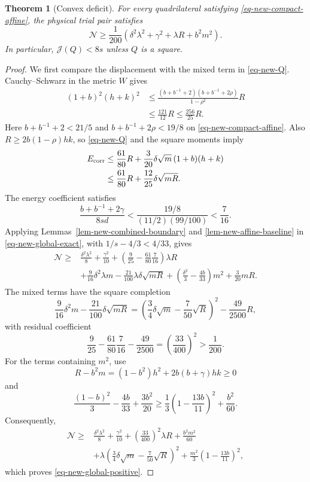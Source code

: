 \documentclass[11pt]{amsart}
\newtheorem{theorem}{Theorem}[section]
\theoremstyle{remark}\newtheorem{remark}[theorem]{Remark}
\numberwithin{equation}{section}
\begin{document}
\begin{theorem}[Convex deficit]\label{thm-uniform-convex}
For every quadrilateral satisfying \eqref{eq-new-compact-affine},
the physical trial pair satisfies
\begin{equation}\label{eq-new-global-positive}
\mathcal N\ge\frac1{200}
\left(\delta^2\lambda^2+\gamma^2+\lambda R+b^2m^2\right).
\end{equation}
In particular, \(\mathcal J(Q)<8s\) unless \(Q\) is a square.
\end{theorem}

\begin{proof}
We first compare the displacement with the mixed term in
\eqref{eq-new-Q}. Cauchy--Schwarz in the metric $W$ gives
\[
\begin{split}
(1+b)^2(h+k)^2
&\le
\frac{(b+b^{-1}+2)(b+b^{-1}+2\rho)}{1-\rho^2}R\\
&\le\frac{121}{12}R\le\frac{256}{25}R.
\end{split}
\]
Here $b+b^{-1}+2<21/5$ and $b+b^{-1}+2\rho<19/8$ on
\eqref{eq-new-compact-affine}. Also
$R\ge2b(1-\rho)hk$, so \eqref{eq-new-Q} and the square moments imply
\[
\begin{split}
E_{\rm corr}
&\le\frac{61}{80}R+
\frac3{20}\delta\sqrt m\,(1+b)(h+k)\\
&\le\frac{61}{80}R+\frac{12}{25}\delta\sqrt{mR}.
\end{split}
\]
The energy coefficient satisfies
\[
\frac{b+b^{-1}+2\gamma}{8sd}
<\frac{19/8}{(11/2)(99/100)}<\frac7{16}.
\]
Applying Lemmas~\ref{lem-new-combined-boundary} and
\ref{lem-new-affine-baseline} in \eqref{eq-new-global-exact}, with
$1/s-4/3<4/33$, gives
\[
\begin{split}
\mathcal N\ge{}&
\frac{\delta^2\lambda^2}{8}+\frac{\gamma^2}{10}
+\left(\frac9{25}-\frac{61}{80}\frac7{16}\right)\lambda R\\
&+\frac9{16}\delta^2\lambda m
-\frac{21}{100}\lambda\delta\sqrt{mR}
+\left(\frac{\delta^2}{3}-\frac{4b}{33}\right)m^2
+\frac3{20}mR.
\end{split}
\]
The mixed terms have the square completion
\[
\frac9{16}\delta^2m-\frac{21}{100}\delta\sqrt{mR}
=\left(\frac34\delta\sqrt m-\frac7{50}\sqrt R\right)^2
-\frac{49}{2500}R,
\]
with residual coefficient
\[
\frac9{25}-\frac{61}{80}\frac7{16}-\frac{49}{2500}
=\left(\frac{33}{400}\right)^2>\frac1{200}.
\]
For the terms containing $m^2$, use
\[
R-b^2m=(1-b^2)h^2+2b(b+\gamma)hk\ge0
\]
and
\[
\frac{(1-b)^2}{3}-\frac{4b}{33}+\frac{3b^2}{20}
\ge\frac13\left(1-\frac{13b}{11}\right)^2+\frac{b^2}{60}.
\]
Consequently,
\[
\begin{split}
\mathcal N\ge{}&
\frac{\delta^2\lambda^2}{8}+\frac{\gamma^2}{10}
+\left(\frac{33}{400}\right)^2\lambda R+\frac{b^2m^2}{60}\\
&+\lambda\left(\frac34\delta\sqrt m-\frac7{50}\sqrt R\right)^2
+\frac{m^2}{3}\left(1-\frac{13b}{11}\right)^2,
\end{split}
\]
which proves \eqref{eq-new-global-positive}.


\end{proof}
\end{document}

